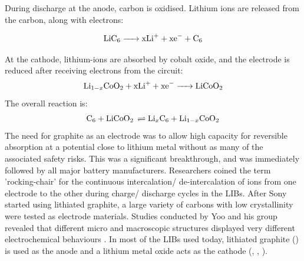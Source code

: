 During discharge at the anode, carbon is oxidised. Lithium ions are released from the carbon, along with electrons:

\begin{equation}
\ce{LiC6 -> xLi+ +  xe- + C6}
\end{equation}

At the cathode, lithium-ions are absorbed by cobalt oxide, and the electrode is reduced after receiving electrons from the circuit:
\begin{equation}
\ce{Li_{1-x}CoO2 + xLi+ + xe- -> LiCoO2}
\end{equation}
The overall reaction is:
\begin{equation}
\ce{C6 + LiCoO2 \rightleftharpoons Li_{x}C6 + Li_{1-x}CoO2}
\end{equation}
The need for graphite as an electrode was to allow high capacity for reversible  absorption at a potential close to lithium metal without as many of the associated safety risks. This was a significant breakthrough, and was immediately followed by all major battery manufacturers. Researchers coined the term 'rocking-chair' for the  continuous intercalation/ de-intercalation of ions from one electrode to the other during charge/ discharge cycles in the LIBs. After Sony started using lithiated graphite, a large variety of carbons with low crystallinity were tested as electrode materials. Studies conducted by Yoo and his group revealed that different micro and macroscopic structures displayed very different electrochemical behaviours \cite{yoo_large_2008}. In most of the LIBs used today, lithiated graphite () is used as the anode and a lithium metal oxide acts as the cathode (, , ).  

